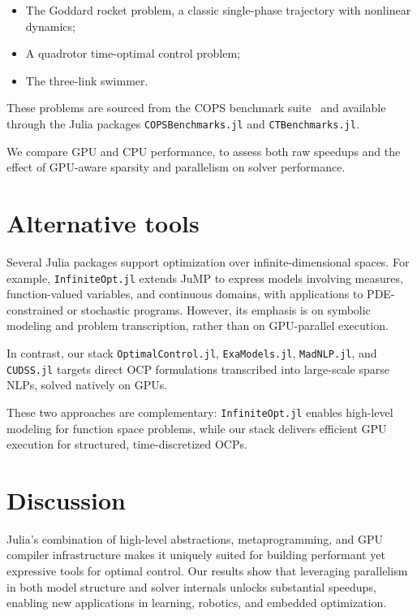 \documentclass[twoside,leqno,twocolumn]{article}
\begin{document}
\begin{itemize}
    \item The Goddard rocket problem, a classic single-phase trajectory with nonlinear dynamics;
    \item A quadrotor time-optimal control problem;
    \item The three-link swimmer.
\end{itemize}

These problems are sourced from the COPS benchmark suite~\cite{bondarenko2000cops} and available through the Julia packages \texttt{COPSBenchmarks.jl} and \texttt{CTBenchmarks.jl}.

We compare GPU and CPU performance,
to assess both raw speedups and the effect of GPU-aware sparsity and parallelism on solver performance.

\section{Alternative tools}

Several Julia packages support optimization over infinite-dimensional spaces.  
For example, \texttt{InfiniteOpt.jl} extends JuMP to express models involving measures, function-valued variables, and continuous domains, with applications to PDE-constrained or stochastic programs.  
However, its emphasis is on symbolic modeling and problem transcription, rather than on GPU-parallel execution.

In contrast, our stack \texttt{OptimalControl.jl}, \texttt{ExaModels.jl}, \texttt{MadNLP.jl}, and \texttt{CUDSS.jl} targets direct OCP formulations transcribed into large-scale sparse NLPs, solved natively on GPUs.

These two approaches are complementary: \texttt{InfiniteOpt.jl} enables high-level modeling for function space problems, while our stack delivers efficient GPU execution for structured, time-discretized OCPs.

\section{Discussion}

Julia’s combination of high-level abstractions, metaprogramming, and GPU compiler infrastructure makes it uniquely suited for building performant yet expressive tools for optimal control.  
Our results show that leveraging parallelism in both model structure and solver internals unlocks substantial speedups, enabling new applications in learning, robotics, and embedded optimization.
\end{document}
